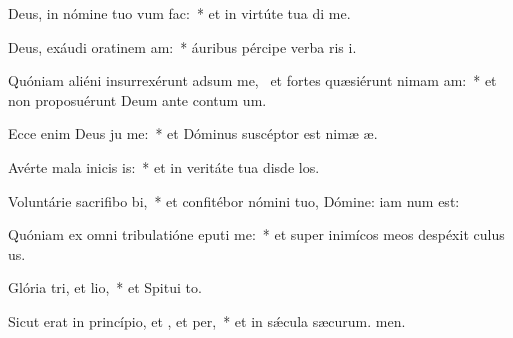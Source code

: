 \item Deus, in nómine tuo vum  fac:~* et in virtúte tua di me.
\item Deus, exáudi oratinem am:~* áuribus pércipe verba ris i.
\item Quóniam aliéni insurrexérunt adsum me,~\pscross{} et fortes quæsiérunt nimam am:~* et non proposuérunt Deum ante contum um.
\item Ecce enim Deus ju me:~* et Dóminus suscéptor est nimæ æ.
\item Avérte mala inicis is:~* et in veritáte tua disde los.
\item Voluntárie sacrifibo bi,~* et confitébor nómini tuo, Dómine: iam num est:
\item Quóniam ex omni tribulatióne eputi me:~* et super inimícos meos despéxit culus us.
\item Glória tri, et lio,~* et Spitui to.
\item Sicut erat in princípio, et , et per,~* et in sǽcula sæcurum. men.
